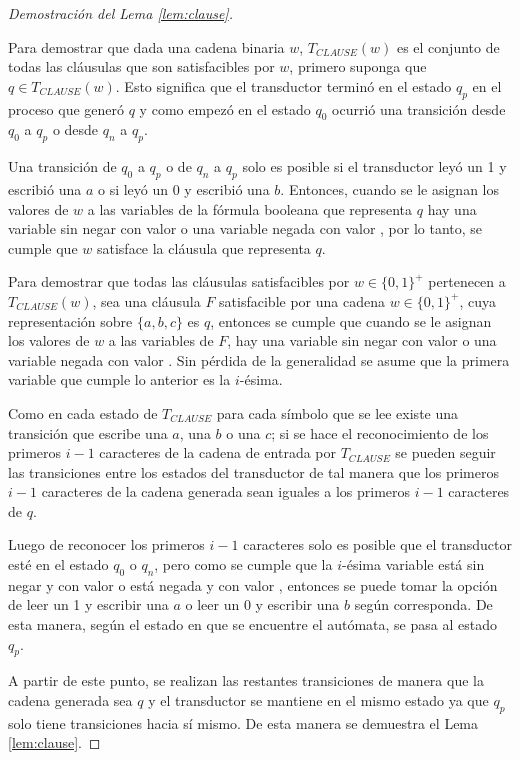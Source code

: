 \begin{proof}[Demostración del Lema \ref{lem:clause}] \
    
    Para demostrar que dada una cadena binaria $w$, $T_{CLAUSE}(w)$ es el conjunto de todas las cláusulas que 
    son satisfacibles por $w$, primero suponga que $q\in T_{CLAUSE}(w)$.  Esto significa que el transductor 
    terminó en el estado $q_p$ en el proceso que generó $q$ y como empezó en el estado $q_0$ ocurrió una 
    transición desde $q_0$ a $q_p$ o desde $q_n$ a $q_p$. 
    
    Una transición de $q_0$ a $q_p$ o de $q_n$ a $q_p$ solo es posible si el transductor leyó un 1 y 
    escribió una $a$ o si leyó un 0 y escribió una $b$. Entonces, cuando se le asignan los valores de 
    $w$ a las variables de la fórmula booleana que representa $q$ hay una variable sin negar con valor 
    \true{} o una variable negada con valor \false{}, por lo tanto, se cumple que $w$ satisface la cláusula 
    que representa $q$. 
    
    Para demostrar que todas las cláusulas satisfacibles por $w\in\{0,1\}^+$ pertenecen a $T_{CLAUSE}(w)$, sea una cláusula $F$ satisfacible por una cadena $w\in\{0,1\}^+$, cuya representación sobre $\{a,b,c\}$ es $q$, entonces se cumple que cuando se le asignan los valores de $w$ a las variables de $F$, hay una variable sin negar con valor \true{} o una variable negada con valor \false{}. Sin pérdida de la generalidad se asume que la primera variable que cumple lo anterior es la $i$-ésima.
    
    Como en cada estado de $T_{CLAUSE}$ para cada símbolo que se lee existe una transición que escribe una $a$, una $b$ o una $c$; si se hace el reconocimiento de los primeros $i-1$ caracteres de la cadena de entrada por $T_{CLAUSE}$ se pueden seguir las transiciones entre los estados del transductor de tal manera que los primeros $i-1$ caracteres de la cadena generada sean iguales a los primeros $i-1$ caracteres de $q$.
    
    Luego de reconocer los primeros $i-1$ caracteres solo es posible que el transductor esté en el estado $q_0$ o $q_n$, pero como se cumple que la $i$-ésima variable está sin negar y con valor \true{} o está negada y con valor \false{}, entonces se puede tomar la opción de leer un 1 y escribir una $a$ o leer un 0 y escribir una $b$ según corresponda.  De esta manera, según el estado en que se encuentre el autómata, se pasa al estado $q_p$.
    
    A partir de este punto, se realizan las restantes transiciones de manera que la cadena generada sea $q$ y el transductor se mantiene en el mismo estado ya que $q_p$ solo tiene transiciones hacia sí mismo. De esta manera se demuestra el Lema \ref{lem:clause}. 
\end{proof}

